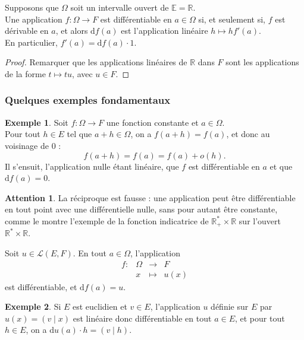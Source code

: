 \documentclass[french]{article}
\newcommand{\R}{\mathbb{R}}
\newcommand{\st}{^*}
\newcommand{\E}{\mathbb{E}}
\renewcommand{\d}{\text{d}}
\theoremstyle{plain}
\theoremstyle{definition}
\newtheorem*{ex}{Exemple}
\newtheorem*{attention}{Attention}
\theoremstyle{remark}
\begin{document}
\begin{prop}%
	Supposons que $\Omega$ soit un intervalle ouvert de $\E=\R$.\\
	Une application $f:\Omega\to F$ est différentiable en $a\in\Omega$ si, et seulement si, $f$ est dérivable en $a$, et alors $\d f(a)$ est l'application linéaire $h\mapsto hf'(a)$.\\
	En particulier, $f'(a)=\d f(a)\cdot 1$.
\end{prop}
\begin{proof}
	Remarquer que les applications linéaires de $\R$ dans $F$ sont les applications de la forme $t\mapsto tu$, avec $u\in F$.
\end{proof}

\subsubsection*{Quelques exemples fondamentaux}

\begin{ex}
	Soit $f:\Omega\to F$ une fonction constante et $a\in\Omega$.\\
	Pour tout $h\in E$ tel que $a+h\in\Omega$, on a $f(a+h)=f(a)$, et donc au voisinage de $0$ :
	$$f(a+h)=f(a)=f(a)+o(h).$$
	Il s'ensuit, l'application nulle étant linéaire, que $f$ est différentiable en $a$ et que $\d f(a)=0$.
\end{ex}

\begin{attention}
	La réciproque est fausse : une application peut être différentiable en tout point avec une différentielle nulle, sans pour autant être constante, comme le montre l'exemple de la fonction indicatrice de $\R_+\st\times\R$ sur l'ouvert $\R\st\times\R$.
\end{attention}

\begin{prop}%
	Soit $u\in\mathcal{L}(E,F)$. En tout $a\in\Omega$, l'application $$\begin{array}{lrcl}
		f:&\Omega&\longrightarrow&F\\
		&x&\longmapsto&u(x)
	\end{array}$$ est différentiable, et $\d f(a)=u$.
\end{prop}

\begin{ex}
	Si $E$ est euclidien et $v\in E$, l'application $u$ définie sur $E$ par $u(x)=(v\mid x)$ est linéaire donc différentiable en tout $a\in E$, et pour tout $h\in E$, on a $\d u(a)\cdot h=(v\mid h)$.
\end{ex}
\end{document}
